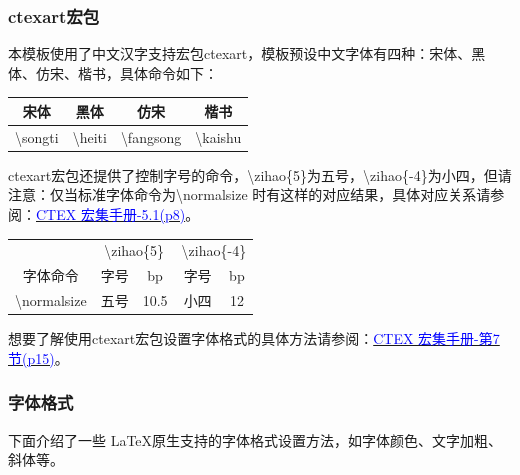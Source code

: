 \documentclass[AutoFakeBold]{ZafuThesis}
\begin{document}
\subsubsection{ctexart宏包}
本模板使用了中文汉字支持宏包ctexart，模板预设中文字体有四种：宋体、黑体、仿宋、楷书，具体命令如下：
\begin{table}[htbp]
  \centering
  \begin{tabular}{c c c c}
    \toprule[1pt]
    宋体 & 黑体 & 仿宋 & 楷书 \\
    \hline
    \textbackslash songti & \textbackslash heiti & \textbackslash fangsong & \textbackslash kaishu \\
    \toprule[1pt]
  \end{tabular}
\end{table}
\par ctexart宏包还提供了控制字号的命令，\textbackslash zihao\{5\}为五号，\textbackslash zihao\{-4\}为小四，但请注意：仅当标准字体命令为\textbackslash normalsize 时有这样的对应结果，具体对应关系请参阅：\href{https://mirrors.ibiblio.org/CTAN/language/chinese/ctex/ctex.pdf}{\textcolor{blue}{CTEX 宏集手册-5.1(p8)}}。


\begin{table}[htbp]
  \centering
  \begin{tabular}{c c c c c}
    \toprule[1pt]
    & \multicolumn{2}{c|}{\textbackslash zihao\{5\}} & \multicolumn{2}{c}{\textbackslash zihao\{-4\}}  \\

   字体命令 & 字号 &\multicolumn{1}{c|}{bp}  & 字号 & bp \\
    \hline
    \textbackslash normalsize & 五号 & 10.5  &  小四 & 12 \\
    \toprule[1pt]
  \end{tabular}
\end{table}

\par
想要了解使用ctexart宏包设置字体格式的具体方法请参阅：\href{https://mirrors.ibiblio.org/CTAN/language/chinese/ctex/ctex.pdf}{\textcolor{blue}{CTEX 宏集手册-第7节(p15)}}。

\subsubsection{字体格式}
下面介绍了一些 \LaTeX  原生支持的字体格式设置方法，如字体颜色、文字加粗、斜体等。
\end{document}
